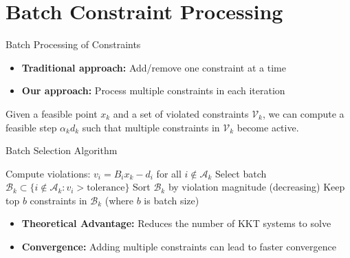 \documentclass{beamer}
\begin{document}
\section{Batch Constraint Processing}

\begin{frame}{Batch Processing of Constraints}
    \begin{itemize}
        \item \textbf{Traditional approach:} Add/remove one constraint at a time
        \item \textbf{Our approach:} Process multiple constraints in each iteration
    \end{itemize}
    
    \begin{theorem}
        Given a feasible point $x_k$ and a set of violated constraints $\mathcal{V}_k$, we can compute a feasible step $\alpha_k d_k$ such that multiple constraints in $\mathcal{V}_k$ become active.
    \end{theorem}
\end{frame}

\begin{frame}{Batch Selection Algorithm}
    \begin{algorithm}[H]
        \caption{Batch Constraint Selection}
        \begin{algorithmic}[1]
            \STATE Compute violations: $v_i = B_i x_k - d_i$ for all $i \notin \mathcal{A}_k$
            \STATE Select batch $\mathcal{B}_k \subset \{i \notin \mathcal{A}_k : v_i > \text{tolerance}\}$
            \STATE Sort $\mathcal{B}_k$ by violation magnitude (decreasing)
            \STATE Keep top $b$ constraints in $\mathcal{B}_k$ (where $b$ is batch size)
        \end{algorithmic}
    \end{algorithm}
    
    \begin{itemize}
        \item \textbf{Theoretical Advantage:} Reduces the number of KKT systems to solve
        \item \textbf{Convergence:} Adding multiple constraints can lead to faster convergence
    \end{itemize}
\end{frame}
\end{document}
